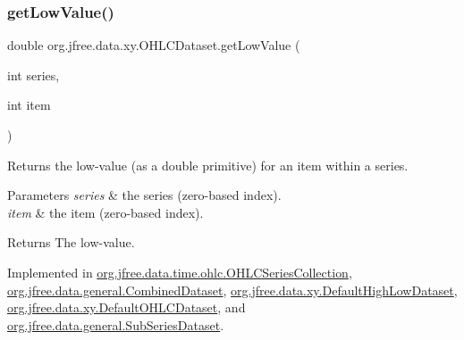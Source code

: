 \subsubsection{\texorpdfstring{get\+Low\+Value()}{getLowValue()}}
{\footnotesize\ttfamily double org.\+jfree.\+data.\+xy.\+O\+H\+L\+C\+Dataset.\+get\+Low\+Value (\begin{DoxyParamCaption}\item[{int}]{series,  }\item[{int}]{item }\end{DoxyParamCaption})}

Returns the low-\/value (as a double primitive) for an item within a series.


\begin{DoxyParams}{Parameters}
{\em series} & the series (zero-\/based index). \\
\hline
{\em item} & the item (zero-\/based index).\\
\hline
\end{DoxyParams}
\begin{DoxyReturn}{Returns}
The low-\/value. 
\end{DoxyReturn}


Implemented in \mbox{\hyperlink{classorg_1_1jfree_1_1data_1_1time_1_1ohlc_1_1_o_h_l_c_series_collection_a23473c76cc9364c1b6a646014eab2423}{org.\+jfree.\+data.\+time.\+ohlc.\+O\+H\+L\+C\+Series\+Collection}}, \mbox{\hyperlink{classorg_1_1jfree_1_1data_1_1general_1_1_combined_dataset_a6bbbc0af890605eb5a42974c29a9c85b}{org.\+jfree.\+data.\+general.\+Combined\+Dataset}}, \mbox{\hyperlink{classorg_1_1jfree_1_1data_1_1xy_1_1_default_high_low_dataset_a4cecc7ed3e3050d94f84389b3d82b9cb}{org.\+jfree.\+data.\+xy.\+Default\+High\+Low\+Dataset}}, \mbox{\hyperlink{classorg_1_1jfree_1_1data_1_1xy_1_1_default_o_h_l_c_dataset_a507dcc283d6624b8da7d12c4352dcd0d}{org.\+jfree.\+data.\+xy.\+Default\+O\+H\+L\+C\+Dataset}}, and \mbox{\hyperlink{classorg_1_1jfree_1_1data_1_1general_1_1_sub_series_dataset_ad14de9483cb4c2fa324f6064a6659228}{org.\+jfree.\+data.\+general.\+Sub\+Series\+Dataset}}.

\mbox{\label{interfaceorg_1_1jfree_1_1data_1_1xy_1_1_o_h_l_c_dataset_a652f2a7a04925cc72472d390217fef08}} 
